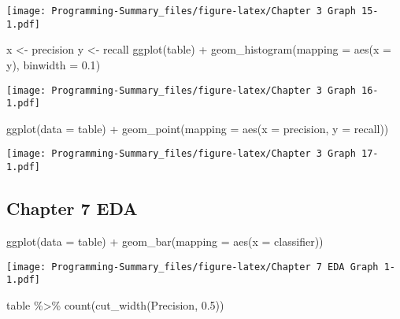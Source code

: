 \documentclass[
]{article}
\newenvironment{Shaded}{\begin{snugshade}}{\end{snugshade}}
\newcommand{\AttributeTok}[1]{\textcolor[rgb]{0.77,0.63,0.00}{#1}}
\newcommand{\FloatTok}[1]{\textcolor[rgb]{0.00,0.00,0.81}{#1}}
\newcommand{\FunctionTok}[1]{\textcolor[rgb]{0.00,0.00,0.00}{#1}}
\newcommand{\NormalTok}[1]{#1}
\newcommand{\OtherTok}[1]{\textcolor[rgb]{0.56,0.35,0.01}{#1}}
\newcommand{\SpecialCharTok}[1]{\textcolor[rgb]{0.00,0.00,0.00}{#1}}
\begin{document}
\texttt{[image: Programming-Summary\_files/figure-latex/Chapter 3 Graph 15-1.pdf]}

\begin{Shaded}
\begin{Highlighting}[]
\NormalTok{x }\OtherTok{\textless{}{-}}\NormalTok{ precision}
\NormalTok{y }\OtherTok{\textless{}{-}}\NormalTok{ recall}
\FunctionTok{ggplot}\NormalTok{(table) }\SpecialCharTok{+} 
  \FunctionTok{geom\_histogram}\NormalTok{(}\AttributeTok{mapping =} \FunctionTok{aes}\NormalTok{(}\AttributeTok{x =}\NormalTok{ y), }\AttributeTok{binwidth =} \FloatTok{0.1}\NormalTok{)}
\end{Highlighting}
\end{Shaded}

\texttt{[image: Programming-Summary\_files/figure-latex/Chapter 3 Graph 16-1.pdf]}

\begin{Shaded}
\begin{Highlighting}[]
\FunctionTok{ggplot}\NormalTok{(}\AttributeTok{data =}\NormalTok{ table) }\SpecialCharTok{+} 
  \FunctionTok{geom\_point}\NormalTok{(}\AttributeTok{mapping =} \FunctionTok{aes}\NormalTok{(}\AttributeTok{x =}\NormalTok{ precision, }\AttributeTok{y =}\NormalTok{ recall))}
\end{Highlighting}
\end{Shaded}

\texttt{[image: Programming-Summary\_files/figure-latex/Chapter 3 Graph 17-1.pdf]}

\hypertarget{chapter-7-eda}{%
\subsection{Chapter 7 EDA}\label{chapter-7-eda}}

\begin{Shaded}
\begin{Highlighting}[]
\FunctionTok{ggplot}\NormalTok{(}\AttributeTok{data =}\NormalTok{ table) }\SpecialCharTok{+}
  \FunctionTok{geom\_bar}\NormalTok{(}\AttributeTok{mapping =} \FunctionTok{aes}\NormalTok{(}\AttributeTok{x =}\NormalTok{ classifier))}
\end{Highlighting}
\end{Shaded}

\texttt{[image: Programming-Summary\_files/figure-latex/Chapter 7 EDA Graph 1-1.pdf]}

\begin{Shaded}
\begin{Highlighting}[]
\NormalTok{table }\SpecialCharTok{\%\textgreater{}\%} 
  \FunctionTok{count}\NormalTok{(}\FunctionTok{cut\_width}\NormalTok{(Precision, }\FloatTok{0.5}\NormalTok{))}
\end{Highlighting}
\end{Shaded}
\end{document}
